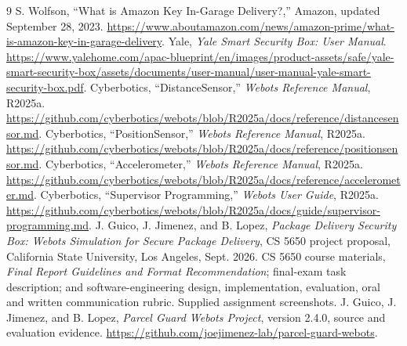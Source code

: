 \documentclass[conference,letterpaper]{IEEEtran}
\newcommand{\ReportVersion}{2.4.0}
\begin{document}
\begin{thebibliography}{9}
 S. Wolfson, ``What is Amazon Key In-Garage Delivery?,'' Amazon, updated September 28, 2023. \url{https://www.aboutamazon.com/news/amazon-prime/what-is-amazon-key-in-garage-delivery}.
 Yale, \emph{Yale Smart Security Box: User Manual}. \url{https://www.yalehome.com/apac-blueprint/en/images/product-assets/safe/yale-smart-security-box/assets/documents/user-manual/user-manual-yale-smart-security-box.pdf}.
 Cyberbotics, ``DistanceSensor,'' \emph{Webots Reference Manual}, R2025a. \url{https://github.com/cyberbotics/webots/blob/R2025a/docs/reference/distancesensor.md}.
 Cyberbotics, ``PositionSensor,'' \emph{Webots Reference Manual}, R2025a. \url{https://github.com/cyberbotics/webots/blob/R2025a/docs/reference/positionsensor.md}.
 Cyberbotics, ``Accelerometer,'' \emph{Webots Reference Manual}, R2025a. \url{https://github.com/cyberbotics/webots/blob/R2025a/docs/reference/accelerometer.md}.
 Cyberbotics, ``Supervisor Programming,'' \emph{Webots User Guide}, R2025a. \url{https://github.com/cyberbotics/webots/blob/R2025a/docs/guide/supervisor-programming.md}.
 J. Guico, J. Jimenez, and B. Lopez, \emph{Package Delivery Security Box: Webots Simulation for Secure Package Delivery}, CS 5650 project proposal, California State University, Los Angeles, Sept. 2026.
 CS 5650 course materials, \emph{Final Report Guidelines and Format Recommendation}; final-exam task description; and software-engineering design, implementation, evaluation, oral and written communication rubric. Supplied assignment screenshots.
 J. Guico, J. Jimenez, and B. Lopez, \emph{Parcel Guard Webots Project}, version \ReportVersion, source and evaluation evidence. \url{https://github.com/joejimenez-lab/parcel-guard-webots}.
\end{thebibliography}
\end{document}
